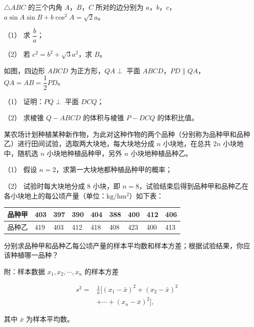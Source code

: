 \begin{question}
$\triangle ABC$ 的三个内角 $A$，$B$，$C$ 所对的边分别为 $a$，$b$，$c$，$a\sin A\sin B+b\cos^2A=\sqrt2a$。

（1） 求 $\dfrac ba$；

（2） 若 $c^2=b^2+\sqrt3a^2$，求 $B$。

\Needspace{0.4\textheight}
\end{question}
\begin{question}
如图，四边形 $ABCD$ 为正方形，$QA\perp$ 平面 $ABCD$，$PD\parallel QA$，$QA=AB=\dfrac12PD$。

（1） 证明：$PQ\perp$ 平面 $DCQ$；

（2） 求棱锥 $Q-ABCD$ 的体积与棱锥 $P-DCQ$ 的体积比值。
\nopagebreak[4]
\begin{center}\end{center}
\nopagebreak[4]
\end{question}
\begin{question}
某农场计划种植某种新作物，为此对这种作物的两个品种（分别称为品种甲和品种乙）进行田间试验，选取两大块地，每大块地分成 $n$ 小块地，在总共 $2n$ 小块地中，随机选 $n$ 小块地种植品种甲，另外 $n$ 小块地种植品种乙。

（1） 假设 $n=2$，求第一大块地都种植品种甲的概率；

（2） 试验时每大块地分成 $8$ 小块，即 $n=8$，试验结束后得到品种甲和品种乙在各小块地上的每公顷产量（单位：$\mathrm{kg/hm^2}$）如下表：

\begin{center}
\begingroup\setlength{\tabcolsep}{4pt}
\begin{tabular}{lllllllll}
\toprule
品种甲 & 403 & 397 & 390 & 404 & 388 & 400 & 412 & 406 \\
\midrule
品种乙 & 419 & 403 & 412 & 418 & 408 & 423 & 400 & 413 \\
\bottomrule
\end{tabular}
\endgroup
\end{center}

分别求品种甲和品种乙每公顷产量的样本平均数和样本方差；根据试验结果，你应该种植哪一品种？

附：样本数据 $x_1,x_2,\cdots,x_n$ 的样本方差

\nopagebreak[4]
\[\begin{aligned}
s^2={}&\frac1n\bigl[(x_1-\bar x)^2+(x_2-\bar x)^2\\
&+\cdots+(x_n-\bar x)^2\bigr],
\end{aligned}\]

其中 $\bar x$ 为样本平均数。

\end{question}
